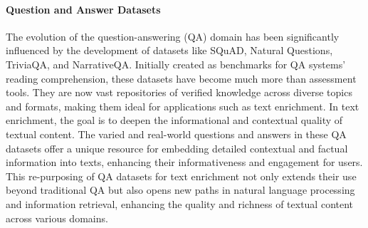 \documentclass[11pt]{article}
\begin{document}
\paragraph{\textbf{Question and Answer Datasets}}


The evolution of the question-answering (QA) domain has been significantly influenced by the development of datasets like SQuAD\cite{DBLP:conf/emnlp/RajpurkarZLL16}, Natural Questions\cite{DBLP:conf/eacl/KamigaitoKSO21}, TriviaQA\cite{DBLP:conf/acl/JoshiCWZ17}, and NarrativeQA\cite{DBLP:journals/tacl/KociskySBDHMG18}. Initially created as benchmarks for QA systems' reading comprehension, these datasets have become much more than assessment tools. They are now vast repositories of verified knowledge across diverse topics and formats, making them ideal for applications such as text enrichment. In text enrichment, the goal is to deepen the informational and contextual quality of textual content. The varied and real-world questions and answers in these QA datasets offer a unique resource for embedding detailed contextual and factual information into texts, enhancing their informativeness and engagement for users. This re-purposing of QA datasets for text enrichment not only extends their use beyond traditional QA but also opens new paths in natural language processing and information retrieval, enhancing the quality and richness of textual content across various domains.
\end{document}
